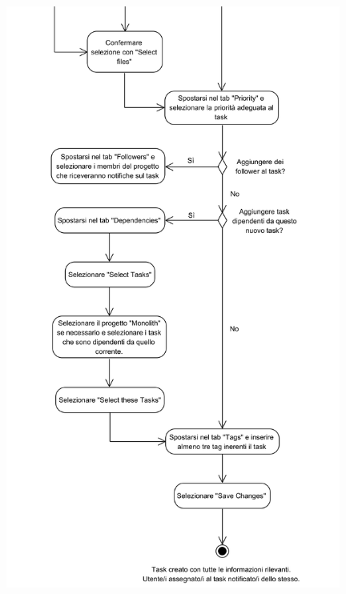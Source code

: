\begin{center}
	\includegraphics[width=11cm]{./DiagrammiProcedure/CreazioneTask2.png}
\end{center}

